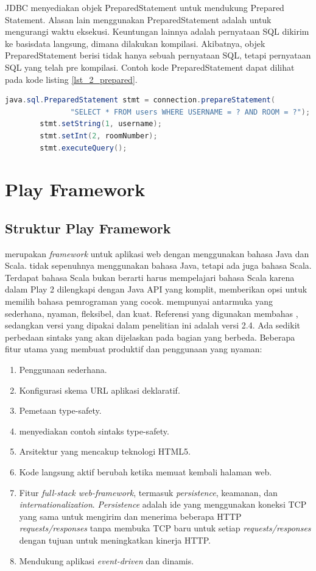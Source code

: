 JDBC menyediakan objek PreparedStatement untuk mendukung Prepared Statement. Alasan lain menggunakan PreparedStatement adalah untuk mengurangi waktu eksekusi. Keuntungan lainnya adalah pernyataan SQL dikirim ke basisdata langsung, dimana dilakukan kompilasi. Akibatnya, objek PreparedStatement berisi tidak hanya sebuah pernyataan SQL, tetapi pernyataan SQL yang telah pre kompilasi. Contoh kode PreparedStatement dapat dilihat pada kode listing \ref{lst_2_prepared}.


\begin{lstlisting}[caption=Contoh PreparedStatement,label = {lst_2_prepared},language=Java]
		java.sql.PreparedStatement stmt = connection.prepareStatement(
               "SELECT * FROM users WHERE USERNAME = ? AND ROOM = ?");
		stmt.setString(1, username);
		stmt.setInt(2, roomNumber);
		stmt.executeQuery();
\end{lstlisting}



\section{Play Framework}
\label{sec:play}
\subsection{Struktur Play Framework}
\play \cite{playforjava} merupakan \textit{framework} untuk aplikasi web dengan menggunakan bahasa Java dan Scala. \play tidak sepenuhnya menggunakan bahasa Java, tetapi ada juga bahasa Scala. Terdapat bahasa Scala bukan berarti harus mempelajari bahasa Scala karena dalam Play 2 dilengkapi dengan Java API yang komplit, memberikan opsi untuk memilih bahasa pemrograman yang cocok. \play mempunyai antarmuka yang sederhana, nyaman, fleksibel, dan kuat. Referensi yang digunakan membahas , sedangkan versi \play yang dipakai dalam penelitian ini adalah versi 2.4. Ada sedikit perbedaan sintaks yang akan dijelaskan pada bagian yang berbeda.
Beberapa fitur utama yang membuat \play produktif dan penggunaan yang nyaman:

\begin{enumerate}
	\item Penggunaan \play sederhana.
	\item Konfigurasi skema URL aplikasi deklaratif.
	\item Pemetaan type-safety.
	\item \play menyediakan contoh sintaks type-safety.
	\item Arsitektur yang mencakup teknologi HTML5.
	\item Kode langsung aktif berubah ketika memuat kembali halaman web.
	\item Fitur \textit{full-stack web-framework}, termasuk \textit{persistence}, keamanan, dan \textit{internationalization}. \textit{Persistence} adalah ide yang menggunakan koneksi TCP yang sama untuk mengirim dan menerima beberapa HTTP \textit{requests/responses} tanpa membuka TCP baru untuk setiap \textit{requests/responses} dengan tujuan untuk meningkatkan kinerja HTTP.
	\item Mendukung aplikasi \textit{event-driven} dan dinamis.
\end{enumerate}

